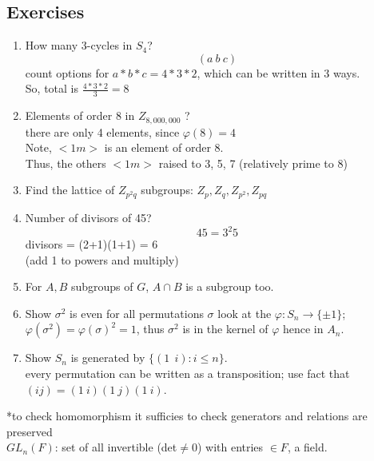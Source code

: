 \documentclass[12pt]{article}
\begin{document}
\subsection*{Exercises}
\begin{enumerate}
    \item How many 3-cycles in $S_4$?
\textcolor[gray]{0.5}{
        $$(a\ b\ c)$$
count options for $a * b * c = 4*3*2$, which can be written in 3 ways. \\
So, total is $\frac{4*3*2}{3} = 8$}


    \item Elements of order 8 in $Z_{8,000,000}$ ?\\
\textcolor[gray]{0.5}{there are only 4 elements, since $\varphi(8) = 4$\\
Note, $<1 m>$ is an element of order 8. \\
Thus, the others $<1 m>$ raised to 3, 5, 7 (relatively prime to 8)}

    \item Find the lattice of $Z_{p^2q}$ 
\textcolor[gray]{0.5}{subgroups: $Z_p, Z_q, Z_{p^2}, Z_{pq}$}

    \item Number of divisors of 45?
    \textcolor[gray]{0.5}{
$$45 = 3^2 5$$
divisors = (2+1)(1+1) = 6\\
(add 1 to powers and multiply)}
    
    \item For $A, B$ subgroups of $G$, $A \cap B$ is a subgroup too.

    \item Show $\sigma^2$ is even for all permutations $\sigma$
    \textcolor[gray]{0.5}{look at the $\varphi: S_n \rightarrow \{\pm 1\}$;\\
    $\varphi(\sigma^2) = \varphi(\sigma)^2 = 1$, thus $\sigma^2$ is in the kernel of $\varphi$ hence in $A_n$.}

    \item Show $S_n$ is generated by $\{(1\ \ i): i \leq n\}$. \\
    \textcolor[gray]{0.5}{every permutation can be written as a transposition; use fact that $(ij) = (1\ i)(1\ j)(1\ i)$.}


\end{enumerate}

*to check homomorphism it sufficies to check generators and relations are preserved\\

$GL_n(F)$: set of all invertible (det$\neq 0$) with entries $\in F$, a field.\\
\end{document}
